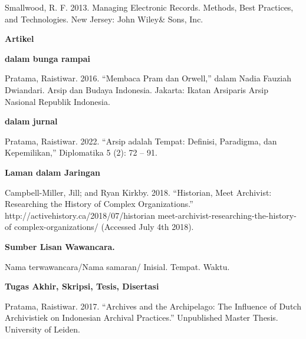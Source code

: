 \documentclass[12pt,a4paper]{article}
\begin{document}
Smallwood, R. F. 2013. Managing Electronic Records. Methods, Best Practices, and Technologies. New Jersey: John Wiley\& Sons, Inc.

\textbf{Artikel}

\textbf{dalam bunga rampai}

Pratama, Raistiwar. 2016. ``Membaca Pram dan Orwell,'' dalam Nadia Fauziah Dwiandari. Arsip dan Budaya Indonesia. Jakarta: Ikatan Arsiparis Arsip Nasional Republik Indonesia.

\textbf{dalam jurnal}

Pratama, Raistiwar. 2022. ``Arsip adalah Tempat: Definisi, Paradigma, dan Kepemilikan,'' Diplomatika 5 (2): 72 -- 91.

\textbf{Laman dalam Jaringan}

Campbell-Miller, Jill; and Ryan Kirkby. 2018. ``Historian, Meet Archivist: Researching the History of Complex Organizations.'' http://activehistory.ca/2018/07/historian meet-archivist-researching-the-history-of complex-organizations/ (Accessed July 4th 2018).

\textbf{Sumber Lisan Wawancara.}

Nama terwawancara/Nama samaran/ Inisial. Tempat. Waktu.

\textbf{Tugas Akhir, Skripsi, Tesis, Disertasi}

Pratama, Raistiwar. 2017. ``Archives and the Archipelago: The Influence of Dutch Archivistiek on Indonesian Archival Practices.'' Unpublished Master Thesis. University of Leiden.
\end{document}
